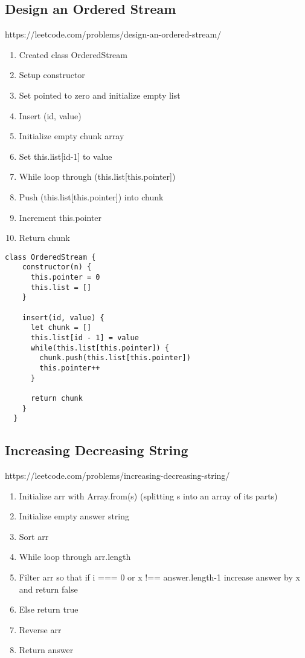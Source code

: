 \documentclass[10pt]{article}
\begin{document}
\pagebreak %
\medskip   
\subsection{Design an Ordered Stream}
https://leetcode.com/problems/design-an-ordered-stream/

\begin{enumerate}
	\item Created class OrderedStream
	\item Setup constructor
	\item Set pointed to zero and initialize empty list 
	\item Insert (id, value)
	\item Initialize empty chunk array
	\item Set this.list[id-1] to value
	\item While loop through (this.list[this.pointer])
	\item Push (this.list[this.pointer]) into chunk
	\item Increment this.pointer
	\item Return chunk 
\end{enumerate}

\begin{lstlisting}[title=Solution orderedStream, captionpos=t]
class OrderedStream {
    constructor(n) {
      this.pointer = 0
      this.list = []
    }
  
    insert(id, value) {
      let chunk = []
      this.list[id - 1] = value
      while(this.list[this.pointer]) {
        chunk.push(this.list[this.pointer])
        this.pointer++
      }
      
      return chunk
    }
  }
\end{lstlisting}
\medskip %




\pagebreak %
\medskip   
\subsection{Increasing Decreasing String}
https://leetcode.com/problems/increasing-decreasing-string/

\begin{enumerate}
	\item Initialize arr with Array.from(s) (splitting s into an array of its parts)
	\item Initialize empty answer string
	\item Sort arr 
	\item While loop through arr.length
	\item Filter arr so that if i === 0 or x !== answer.length-1 increase answer by x and return false
	\item Else return true 
	\item Reverse arr
	\item Return answer 
\end{enumerate}
\end{document}
